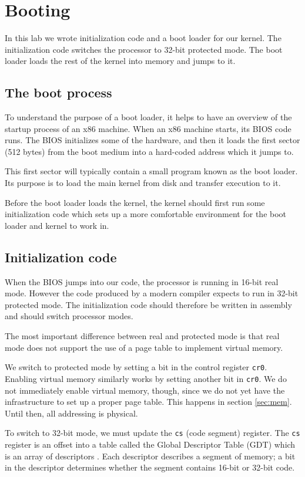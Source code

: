 \documentclass{report}
\begin{document}
\chapter{Booting}
\label{sec:lab1}

In this lab we wrote initialization code and a boot loader for our kernel. 
The initialization code switches the processor to 32-bit protected mode. The
boot loader loads the rest of the kernel into memory and jumps to it.

\section{The boot process}
To understand the purpose of a boot loader, it helps to have an overview of
the startup process of an x86 machine.
When an x86 machine starts, its BIOS code runs. The BIOS initializes some of
the hardware, and then it loads the first sector (512 bytes) from the boot
medium into a hard-coded address which it jumps to.

This first sector will typically contain a small program known as the boot
loader. Its purpose is to load the main kernel from disk and transfer
execution to it.

Before the boot loader loads the kernel, the kernel should first run some
initialization code which sets up a more comfortable environment for the boot
loader and kernel to work in.


\section{Initialization code}
When the BIOS jumps into our code, the processor is running in 16-bit real
mode. However the code produced by a modern compiler expects to run in 32-bit
protected mode. The initialization code should therefore be written in
assembly and should switch processor modes.

The most important difference between real and protected mode is that real
mode does not support the use of a page table to implement virtual memory.

We switch to protected mode by setting a bit in the control register
\texttt{cr0}. Enabling virtual memory similarly works by setting another bit
in \texttt{cr0}. We do not immediately enable virtual memory, though, since we
do not yet have the infrastructure to set up a proper page table. This happens
in section \ref{sec:mem}. Until then, all addressing is physical.

To switch to 32-bit mode, we must update the \texttt{cs} (code segment)
register. The \texttt{cs} register is an offset into a table called the Global
Descriptor Table (GDT) which is an array of descriptors \cite{gdt}. Each
descriptor describes a segment of memory; a bit in the descriptor determines
whether the segment contains 16-bit or 32-bit code. 
\end{document}
